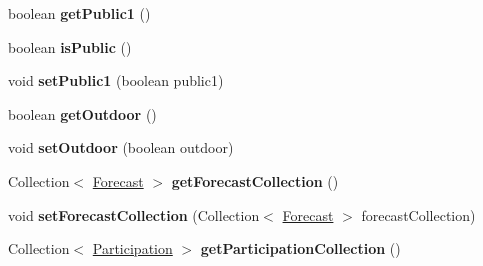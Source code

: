 \begin{DoxyCompactItemize}
\item 
\hypertarget{classit_1_1polimi_1_1se_1_1calcare_1_1entities_1_1Event_a191f6f43eb65f1e6fb7d4a7a675cd7a5}{}boolean {\bfseries get\+Public1} ()\label{classit_1_1polimi_1_1se_1_1calcare_1_1entities_1_1Event_a191f6f43eb65f1e6fb7d4a7a675cd7a5}

\item 
\hypertarget{classit_1_1polimi_1_1se_1_1calcare_1_1entities_1_1Event_a840285afcc62db4966463a1027376eb9}{}boolean {\bfseries is\+Public} ()\label{classit_1_1polimi_1_1se_1_1calcare_1_1entities_1_1Event_a840285afcc62db4966463a1027376eb9}

\item 
\hypertarget{classit_1_1polimi_1_1se_1_1calcare_1_1entities_1_1Event_ab28a4a23e0b81f12f2f0bd3b97d24fb4}{}void {\bfseries set\+Public1} (boolean public1)\label{classit_1_1polimi_1_1se_1_1calcare_1_1entities_1_1Event_ab28a4a23e0b81f12f2f0bd3b97d24fb4}

\item 
\hypertarget{classit_1_1polimi_1_1se_1_1calcare_1_1entities_1_1Event_a473bbf5dbff7ab837740a94ec4ad6310}{}boolean {\bfseries get\+Outdoor} ()\label{classit_1_1polimi_1_1se_1_1calcare_1_1entities_1_1Event_a473bbf5dbff7ab837740a94ec4ad6310}

\item 
\hypertarget{classit_1_1polimi_1_1se_1_1calcare_1_1entities_1_1Event_a0821ab0a8d25f512ab8e8c65e8927464}{}void {\bfseries set\+Outdoor} (boolean outdoor)\label{classit_1_1polimi_1_1se_1_1calcare_1_1entities_1_1Event_a0821ab0a8d25f512ab8e8c65e8927464}

\item 
\hypertarget{classit_1_1polimi_1_1se_1_1calcare_1_1entities_1_1Event_a8176fb114557edb00a588d87219af9f7}{}Collection$<$ \hyperlink{classit_1_1polimi_1_1se_1_1calcare_1_1entities_1_1Forecast}{Forecast} $>$ {\bfseries get\+Forecast\+Collection} ()\label{classit_1_1polimi_1_1se_1_1calcare_1_1entities_1_1Event_a8176fb114557edb00a588d87219af9f7}

\item 
\hypertarget{classit_1_1polimi_1_1se_1_1calcare_1_1entities_1_1Event_a45d9c15f902214d8e22836ae0e13532a}{}void {\bfseries set\+Forecast\+Collection} (Collection$<$ \hyperlink{classit_1_1polimi_1_1se_1_1calcare_1_1entities_1_1Forecast}{Forecast} $>$ forecast\+Collection)\label{classit_1_1polimi_1_1se_1_1calcare_1_1entities_1_1Event_a45d9c15f902214d8e22836ae0e13532a}

\item 
\hypertarget{classit_1_1polimi_1_1se_1_1calcare_1_1entities_1_1Event_ad1de0661e729b64833e72e7509ced8df}{}Collection$<$ \hyperlink{classit_1_1polimi_1_1se_1_1calcare_1_1entities_1_1Participation}{Participation} $>$ {\bfseries get\+Participation\+Collection} ()\label{classit_1_1polimi_1_1se_1_1calcare_1_1entities_1_1Event_ad1de0661e729b64833e72e7509ced8df}


\end{DoxyCompactItemize}
